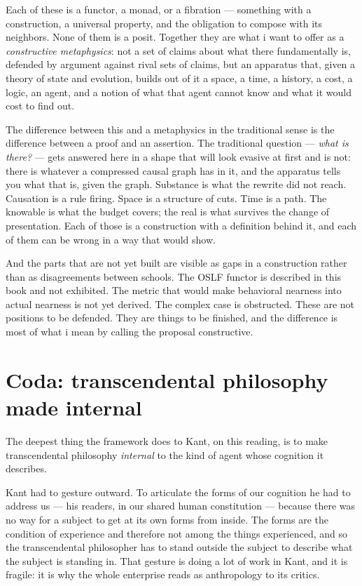 Each of these is a functor, a monad, or a fibration --- something
with a construction, a universal property, and the obligation to
compose with its neighbors.
None of them is a posit.
Together they are what i want to offer as a \emph{constructive
metaphysics}: not a set of claims about what there fundamentally
is, defended by argument against rival sets of claims, but an
apparatus that, given a theory of state and evolution, builds out
of it a space, a time, a history, a cost, a logic, an agent, and a
notion of what that agent cannot know and what it would cost to
find out.

The difference between this and a metaphysics in the traditional
sense is the difference between a proof and an assertion.
The traditional question --- \emph{what is there?} --- gets
answered here in a shape that will look evasive at first and is
not: there is whatever a compressed causal graph has in it, and the
apparatus tells you what that is, given the graph.
Substance is what the rewrite did not reach.
Causation is a rule firing.
Space is a structure of cuts.
Time is a path.
The knowable is what the budget covers; the real is what survives
the change of presentation.
Each of those is a construction with a definition behind it, and
each of them can be wrong in a way that would show.

And the parts that are not yet built are visible as gaps in a
construction rather than as disagreements between schools.
The OSLF functor is described in this book and not exhibited.
The metric that would make behavioral nearness into actual nearness
is not yet derived.
The complex case is obstructed.
These are not positions to be defended.
They are things to be finished, and the difference is most of what
i mean by calling the proposal constructive.

\section{Coda: transcendental philosophy made internal}
\label{sec:kant-coda}

The deepest thing the framework does to Kant, on this reading, is to
make transcendental philosophy \emph{internal} to the kind of agent
whose cognition it describes.

Kant had to gesture outward.
To articulate the forms of our cognition he had to address us --- his
readers, in our shared human constitution --- because there was no
way for a subject to get at its own forms from inside.
The forms are the condition of experience and therefore not among
the things experienced, and so the transcendental philosopher has
to stand outside the subject to describe what the subject is
standing in.
That gesture is doing a lot of work in Kant, and it is fragile: it
is why the whole enterprise reads as anthropology to its critics.

